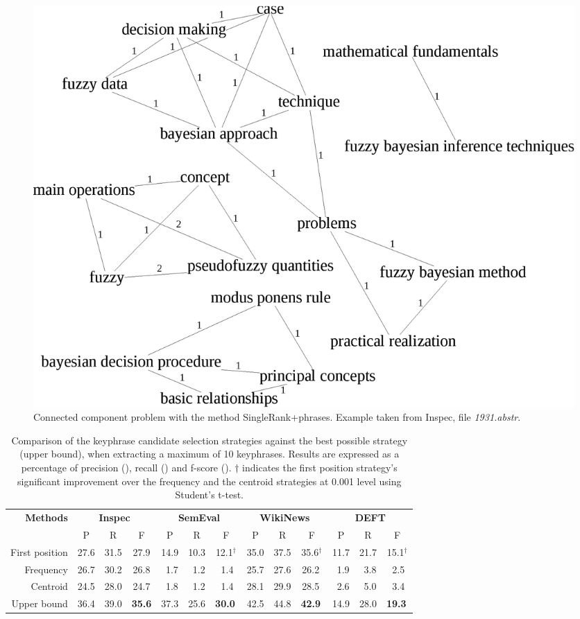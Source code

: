   \begin{figure}[h]
    \centering
    \includegraphics[width=.475\textwidth]{include/1931.eps}
    \caption{Connected component problem with the method SingleRank+phrases.
             Example taken from Inspec, file \textit{1931.abstr}.
             \label{fig:phrases_graph}}
  \end{figure}

  \begin{table}
    \centering
    \begin{tabular}{@{ }rcccccccccccc@{ }}
      \toprule
      \multirow{2}{*}[-2pt]{\textbf{Methods}} & \multicolumn{3}{c}{\textbf{Inspec}} & \multicolumn{3}{c}{\textbf{SemEval}} & \multicolumn{3}{c}{\textbf{WikiNews}} & \multicolumn{3}{c}{\textbf{DEFT}}\\
      \cmidrule(lr){2-4}\cmidrule(lr){5-7}\cmidrule(lr){8-10}\cmidrule(l){11-13}
      & P & R & F & P & R & F & P & R & F & P & R & F\\
      \midrule
      First position & 27.6 & 31.5 & 27.9  & 14.9 & 10.3 & 12.1$^\dagger$ & 35.0 & 37.5 & 35.6$^\dagger$ & 11.7 & 21.7 & 15.1$^\dagger$\\
      Frequency & 26.7 & 30.2 & 26.8 & $~~$1.7 & $~~$1.2 & $~~$1.4$^{~}$ & 25.7 & 27.6 & 26.2$^{~}$ & $~~$1.9 & $~~$3.8 & $~~$2.5$^{~}$\\
      Centroid & 24.5 & 28.0 & 24.7 & $~~$1.8 & $~~$1.2 & $~~$1.4$^{~}$ & 28.1 & 29.9 & 28.5$^{~}$ & $~~$2.6 & $~~$5.0 & $~~$3.4$^{~}$\\
      \midrule
      Upper bound & 36.4 & 39.0 & \textbf{35.6} & 37.3 & 25.6 & \textbf{30.0}$^{~}$ & 42.5 & 44.8 & \textbf{42.9}$^{~}$ & 14.9 & 28.0 & \textbf{19.3}$^{~}$\\
      \bottomrule
    \end{tabular}
    \caption{Comparison of the keyphrase candidate selection strategies against
             the best possible strategy (upper bound), when extracting a maximum
             of 10 keyphrases. Results are expressed as a percentage of
             precision (), recall () and f-score ().
             $\dagger$ indicates the first position strategy's significant
             improvement over the frequency and the centroid strategies at 0.001
             level using Student's t-test.
             \label{tab:cluster_ranking_evaluation}}
  \end{table}
  
